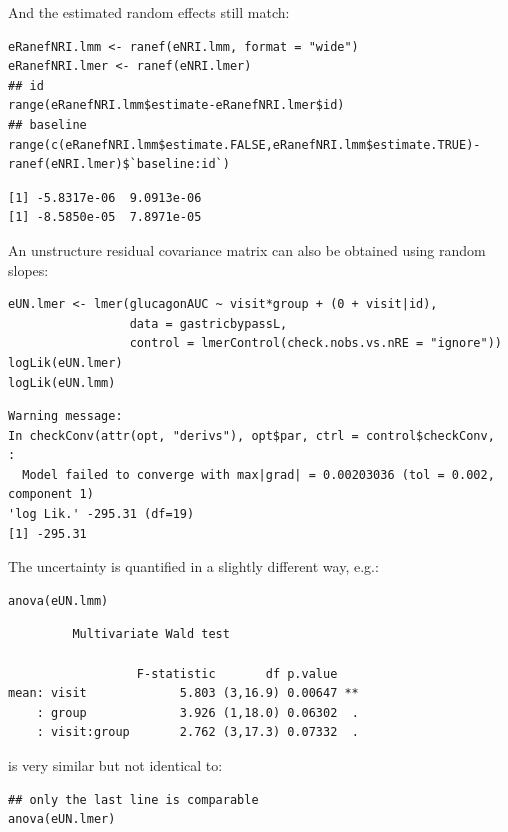 \documentclass[12pt]{article}
\begin{document}
And the estimated random effects still match:
\lstset{language=r,label= ,caption= ,captionpos=b,numbers=none}
\begin{lstlisting}
eRanefNRI.lmm <- ranef(eNRI.lmm, format = "wide")
eRanefNRI.lmer <- ranef(eNRI.lmer)
## id
range(eRanefNRI.lmm$estimate-eRanefNRI.lmer$id)
## baseline
range(c(eRanefNRI.lmm$estimate.FALSE,eRanefNRI.lmm$estimate.TRUE)-ranef(eNRI.lmer)$`baseline:id`)
\end{lstlisting}

\begin{verbatim}
[1] -5.8317e-06  9.0913e-06
[1] -8.5850e-05  7.8971e-05
\end{verbatim}


\clearpage

An unstructure residual covariance matrix can also be obtained using
random slopes:
\lstset{language=r,label= ,caption= ,captionpos=b,numbers=none}
\begin{lstlisting}
eUN.lmer <- lmer(glucagonAUC ~ visit*group + (0 + visit|id),
                 data = gastricbypassL,
                 control = lmerControl(check.nobs.vs.nRE = "ignore"))
logLik(eUN.lmer)
logLik(eUN.lmm)
\end{lstlisting}

\begin{verbatim}
Warning message:
In checkConv(attr(opt, "derivs"), opt$par, ctrl = control$checkConv,  :
  Model failed to converge with max|grad| = 0.00203036 (tol = 0.002, component 1)
'log Lik.' -295.31 (df=19)
[1] -295.31
\end{verbatim}


The uncertainty is quantified in a slightly different way, e.g.:
\lstset{language=r,label= ,caption= ,captionpos=b,numbers=none}
\begin{lstlisting}
anova(eUN.lmm)
\end{lstlisting}

\begin{verbatim}
	     Multivariate Wald test 

                  F-statistic       df p.value   
mean: visit             5.803 (3,16.9) 0.00647 **
    : group             3.926 (1,18.0) 0.06302  .
    : visit:group       2.762 (3,17.3) 0.07332  .
\end{verbatim}


is very similar but not identical to:
\lstset{language=r,label= ,caption= ,captionpos=b,numbers=none}
\begin{lstlisting}
## only the last line is comparable
anova(eUN.lmer)
\end{lstlisting}
\end{document}
